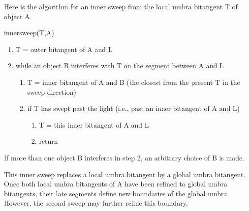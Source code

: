 \documentclass[9pt,twocolumn]{article}
\begin{document}
Here is the algorithm for an inner sweep from the local umbra bitangent T of object A.


\vspace{.2in}

\centerline{innersweep(T,A)}

\begin{enumerate}
\item T = outer bitangent of A and L
\item while an object B interferes with T on the segment between A and L
\begin{enumerate}
\item T = inner bitangent of A and B (the closest from the present T 
	in the sweep direction)
\item if T has swept past the light (i.e., past an inner bitangent of A and L)
\begin{enumerate}
\item  T = this inner bitangent of A and L
\item  return
\end{enumerate}
\end{enumerate}
\end{enumerate}

If more than one object B interferes in step 2,
an arbitrary choice of B is made.

This inner sweep replaces a local umbra bitangent by a global umbra bitangent.
Once both local umbra bitangents of A have been refined
to global umbra bitangents, their late segments define new boundaries
of the global umbra.
However, the second sweep may further refine this boundary.
\end{document}
